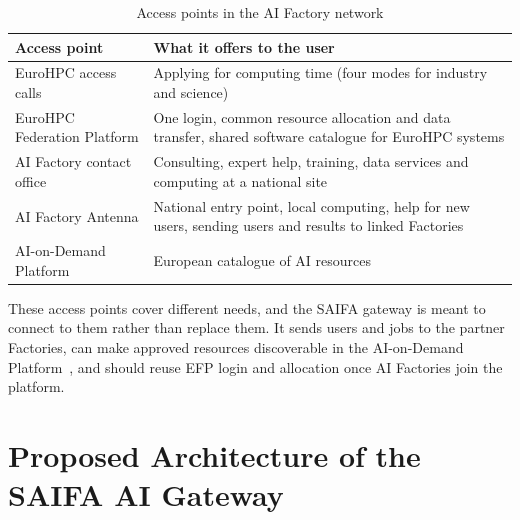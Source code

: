 \documentclass[conference,a4paper]{IEEEtran}
\newif\ifizmene
\DeclareRobustCommand{\chg}[1]{\ifizmene{\color{blue}#1}\else#1\fi}
\DeclareRobustCommand{\roz}[1]{\ifizmene{\color{roze}#1}\else#1\fi}
\DeclareRobustCommand{\nov}[1]{\ifizmene{\color{nova}#1}\else#1\fi}
\begin{document}
\begin{table}[!h]
\centering
\caption{Access points in the AI Factory network}
\label{tab:landscape}
\footnotesize
\renewcommand{\arraystretch}{1.0}
\begin{tabular}{@{}>{\raggedright\arraybackslash}p{2.25cm}>{\raggedright\arraybackslash}p{5.75cm}@{}}
\toprule
\textbf{Access point} & \textbf{What it offers to the user} \\
\midrule
EuroHPC access calls & Applying for computing time (\roz{four modes for} industry and science) \\
EuroHPC Federation Platform & One login, common resource allocation and data transfer, shared software catalogue for EuroHPC systems \\
AI Factory contact office & Consulting, expert help, training, data services and computing at a national site \\
AI Factory Antenna & National entry point, local computing, help for new users, sending users and results to linked Factories \\
AI-on-Demand Platform & European catalogue of AI resources \\
\bottomrule
\end{tabular}
\end{table}

\chg{These access points cover different needs,} \nov{and the SAIFA gateway is meant to connect to them rather than replace them. It sends users and jobs to the partner Factories, can make approved resources discoverable in the AI-on-Demand Platform}~\cite{saifa_d31}\nov{, and should reuse EFP login and allocation once AI Factories join the platform.}

\section{\nov{Proposed Architecture of the SAIFA AI Gateway}}
\label{sec:model}
\end{document}
